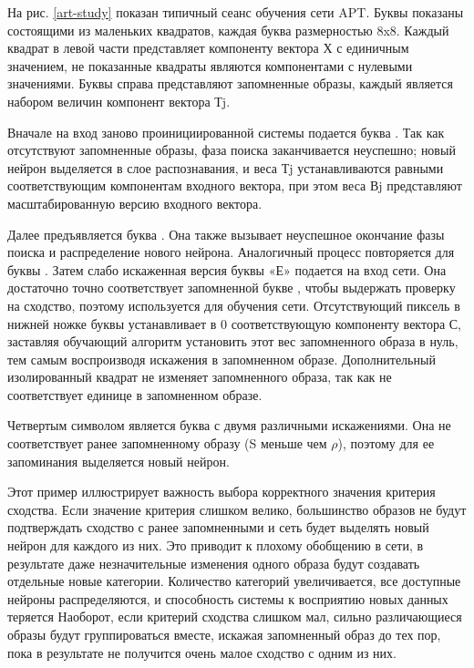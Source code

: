 \documentclass[14pt,a4paper,report]{article}
\begin{document}
На рис. \ref{art-study} показан типичный сеанс обучения сети APT. Буквы показаны состоящими из маленьких квадратов, каждая буква размерностью 8x8. Каждый квадрат в левой части представляет компоненту вектора Х с единичным значением, не показанные квадраты являются компонентами с нулевыми значениями. Буквы справа представляют запомненные образы, каждый является набором величин компонент вектора Тj.

Вначале на вход заново проинициированной системы подается буква . Так как отсутствуют запомненные образы, фаза поиска заканчивается неуспешно; новый нейрон выделяется в слое распознавания, и веса Тj устанавливаются равными соответствующим компонентам входного вектора, при этом веса Вj представляют масштабированную версию входного вектора.

Далее предъявляется буква . Она также вызывает неуспешное окончание фазы поиска и распределение нового нейрона. Аналогичный процесс повторяется для буквы . Затем слабо искаженная версия буквы «Е» подается на вход сети. Она достаточно точно соответствует запомненной букве , чтобы выдержать проверку на сходство, поэтому используется для обучения сети. Отсутствующий пиксель в нижней ножке буквы  устанавливает в 0 соответствующую компоненту вектора С, заставляя обучающий алгоритм установить этот вес запомненного образа в нуль, тем самым воспроизводя искажения в запомненном образе. Дополнительный изолированный квадрат не изменяет запомненного образа, так как не соответствует единице в запомненном образе.

Четвертым символом является буква  с двумя различными искажениями. Она не соответствует ранее запомненному образу (S меньше чем $\rho$), поэтому для ее запоминания выделяется новый нейрон.

Этот пример иллюстрирует важность выбора корректного значения критерия сходства. Если значение критерия слишком велико, большинство образов не будут подтверждать сходство с ранее запомненными и сеть будет выделять новый нейрон для каждого из них. Это приводит к плохому обобщению в сети, в результате даже незначительные изменения одного образа будут создавать отдельные новые категории. Количество категорий увеличивается, все доступные нейроны распределяются, и способность системы к восприятию новых данных теряется \cite{cite-techn-adapt} Наоборот, если критерий сходства слишком мал, сильно различающиеся образы будут группироваться вместе, искажая запомненный образ до тех пор, пока в результате не получится очень малое сходство с одним из них.
\end{document}
